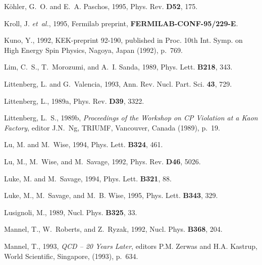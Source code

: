 \begin{thebibliography}{\protect{}1991}
K{\"o}hler, G.~O. and E.~A. Paschos, 1995,
\newblock Phys. Rev. {\bf D52}, 175.

Kroll, J. {\em et~al.\/}, 1995,
\newblock Fermilab preprint, {\bf FERMILAB-CONF-95/229-E}.

Kuno, Y., 1992,
\newblock KEK-preprint 92-190, {\rm published in} Proc. 10th Int. Symp. on High
  Energy Spin Physics, Nagoya, Japan (1992), p.\ 769.

Lim, C.~S., T.~Morozumi, and A.~I. Sanda, 1989,
\newblock Phys. Lett. {\bf B218}, 343.

Littenberg, L. and G.~Valencia, 1993,
\newblock Ann. Rev. Nucl. Part. Sci. {\bf 43}, 729.

Littenberg, L., 1989a,
\newblock Phys. Rev. {\bf D39}, 3322.

Littenberg, L.~S., 1989b,
 {\em Proceedings of the Workshop on CP Violation at a Kaon
  Factory}, {\rm editor J.N.\ Ng, TRIUMF, Vancouver, Canada (1989), p.\ 19}.

Lu, M. and M.~Wise, 1994,
\newblock Phys. Lett. {\bf B324}, 461.

Lu, M., M.~Wise, and M.~Savage, 1992,
\newblock Phys. Rev. {\bf D46}, 5026.

Luke, M. and M.~Savage, 1994,
\newblock Phys. Lett. {\bf B321}, 88.

Luke, M., M.~Savage, and M.~B. Wise, 1995,
\newblock Phys. Lett. {\bf B343}, 329.

Lusignoli, M., 1989,
\newblock Nucl. Phys. {\bf B325}, 33.

Mannel, T., W.~Roberts, and Z.~Ryzak, 1992,
\newblock Nucl. Phys. {\bf B368}, 204.

Mannel, T., 1993,
 {\em QCD -- 20 Years Later}, {\rm editors P.M. Zerwas and
  H.A. Kastrup, World Scientific, Singapore, (1993), p.\ 634}.


\end{thebibliography}

